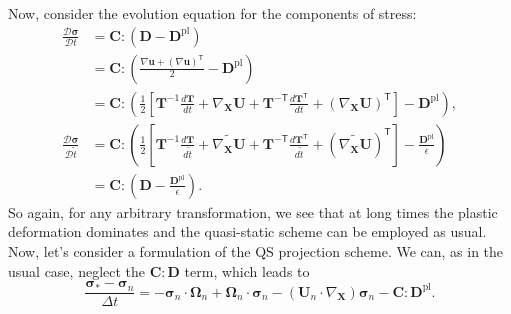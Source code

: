 \documentclass[11pt]{article}
\newcommand{\p}{\partial}
\newcommand{\bsig}{\boldsymbol\sigma}
\newcommand{\bOmega}{\boldsymbol\Omega}
\newcommand{\mcD}{\mathcal{D}}
\newcommand{\bC}{\mathbf{C}}
\newcommand{\bD}{\mathbf{D}}
\newcommand{\bT}{\mathbf{T}}
\newcommand{\bU}{\mathbf{U}}
\newcommand{\bX}{\mathbf{X}}
\newcommand{\bu}{\mathbf{u}}
\newcommand{\Trans}{\mathsf{T}}
\newcommand{\bDpl}{\bD^\text{pl}}
\begin{document}
Now, consider the evolution equation for the components of stress:
\begin{align}
    \frac{\mcD\bsig}{\mcD t} &= \bC : \left(\bD - \bDpl\right) \nonumber \\
    &= \bC : \left( \frac{\nabla\bu + (\nabla\bu)^\Trans}{2} - \bDpl\right) \nonumber\\
    &= \bC : \left( \frac{1}{2} \left[ \bT^{-1}\frac{d\bT}{dt} + \nabla_\bX\bU + \bT^{-\Trans}\frac{d\bT^\Trans}{dt} + (\nabla_\bX\bU)^\Trans\right]  - \bDpl \right),\\
    \frac{\mcD \bsig}{\mcD \tilde{t}} &= \bC : \left( \frac{1}{2} \left[ \bT^{-1}\frac{d\bT}{d\tilde{t}} + \widetilde{\nabla_\bX\bU} + \bT^{-\Trans}\frac{d\bT^\Trans}{d\tilde{t}} + (\widetilde{\nabla_\bX\bU})^\Trans\right]  - \frac{\bDpl}{\epsilon} \right) \nonumber \\
    &= \bC : \left(\bD - \frac{\bDpl}{\epsilon}\right).
\end{align}
So again, for any arbitrary transformation, we see that at long times the plastic deformation dominates and the quasi-static scheme can be employed as usual.
Now, let's consider a formulation of the QS projection scheme. We can, as in the usual case, neglect the $\bC:\bD$ term, which leads to
\begin{equation}
  \frac{\bsig_* - \bsig_n}{\Delta t} = -\bsig_n\cdot\bOmega_n + \bOmega_n\cdot\bsig_n - \left(\bU_n\cdot\nabla_\bX\right)\bsig_n - \bC:\bDpl.
  \label{eqn:qs_first_step}
\end{equation}
\end{document}
